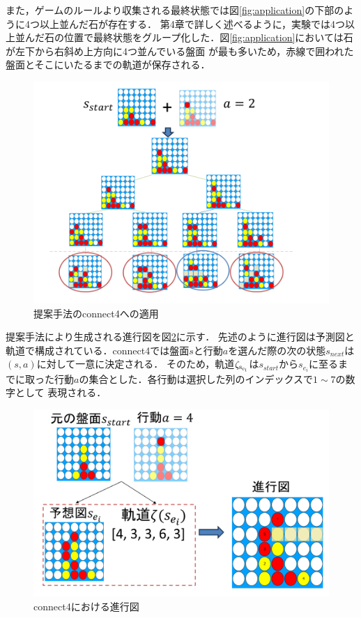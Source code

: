 また，ゲームのルールより収集される最終状態では図\ref{fig:application}の下部のように4つ以上並んだ石が存在する．
第4章で詳しく述べるように，実験では4つ以上並んだ石の位置で最終状態をグループ化した．図\ref{fig:application}においては石が左下から右斜め上方向に4つ並んでいる盤面
が最も多いため，赤線で囲われた盤面とそこにいたるまでの軌道が保存される．
\begin{figure}[t]
	\centering
	\includegraphics[width=\linewidth]{./figure/application.png}
	\caption{提案手法のconnect4への適用}
	\label{fig:double}
\end{figure}

提案手法により生成される進行図を図\ref{fig:double}に示す．
先述のように進行図は予測図と軌道で構成されている．connect4では盤面$s$と行動$a$を選んだ際の次の状態$s_{next}$は$(s, a)$に対して一意に決定される．
そのため，軌道$\rm{{\zeta}_{s_{e_i}}}$は$s_{start}$から$s_{e_i}$に至るまでに取った行動$a$の集合とした．各行動は選択した列のインデックスで$1\sim7$の数字として
表現される．
\begin{figure}[t]
	\centering
	\includegraphics[width=\linewidth]{./figure/double.png}
	\caption{connect4における進行図}
	\label{fig:double}
\end{figure}
